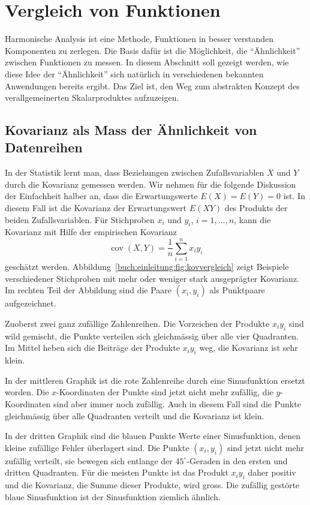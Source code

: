 %
%
%
\section{Vergleich von Funktionen
\label{buch:einleitung:section:vergleich}}
Harmonische Analysis ist eine Methode, Funktionen in besser
verstanden Komponenten zu zerlegen.
Die Basis dafür ist die Möglichkeit, die ``Ähnlichkeit'' zwischen
Funktionen zu messen.
In diesem Abschnitt soll gezeigt werden, wie diese Idee der
``Ähnlichkeit'' sich natürlich in verschiedenen bekannten
Anwendungen bereits ergibt.
Das Ziel ist, den Weg zum abstrakten Konzept des verallgemeinerten
Skalarproduktes aufzuzeigen.

%
%
\subsection{Kovarianz als Mass der Ähnlichkeit von Datenreihen}
In der Statistik lernt man, dass Beziehungen zwischen Zufallsvariablen
$X$ und $Y$ durch die Kovarianz gemessen werden.
Wir nehmen für die folgende Diskussion der Einfachheit halber an,
dass die Erwartungswerte $E(X)=E(Y)=0$ ist.
In diesem Fall ist die Kovarianz der Erwartungswert $E(XY)$ des
Produkts der beiden Zufallsvariablen.
Für Stichproben $x_i$ und $y_i$, $i=1,\dots,n$, kann die Kovarianz mit
Hilfe der empirischen Kovarianz
\[
\operatorname{cov}(X,Y)
=
\frac{1}{n}
\sum_{i=1}^n x_iy_i
\]
geschätzt werden.
Abbildung~\ref{buch:einleitung:fig:kovvergleich} zeigt Beispiele
verschiedener Stichproben mit mehr oder weniger stark ausgeprägter
Kovarianz.
Im rechten Teil der Abbildung sind die Paare $(x_i,y_i)$ als
Punktpaare aufgezeichnet.

Zuoberst zwei ganz zufällige Zahlenreihen.
Die Vorzeichen der Produkte $x_iy_i$ sind wild gemischt, die Punkte
verteilen sich gleichmässig über alle vier Quadranten.
Im Mittel heben sich die Beiträge der Produkte $x_iy_i$ weg, die
Kovarianz ist sehr klein.

In der mittleren Graphik ist die rote Zahlenreihe durch eine Sinusfunktion
ersetzt worden.
Die $x$-Koordinaten der Punkte sind jetzt nicht mehr zufällig, die
$y$-Koordinaten sind aber immer noch zufällig. 
Auch in diesem Fall sind die Punkte gleichmässig über alle Quadranten
verteilt und die Kovarianz ist klein.

In der dritten Graphik sind die blauen Punkte Werte einer
Sinusfunktion, denen kleine zufällige Fehler überlagert sind.
Die Punkte $(x_i,y_i)$ sind jetzt nicht mehr zufällig verteilt,
sie bewegen sich entlange der $45^\circ$-Geraden in den ersten
und dritten Quadranten.
Für die meisten Punkte ist das Produkt $x_iy_i$ daher positiv und
die Kovarianz, die Summe dieser Produkte, wird gross.
Die zufällig gestörte blaue Sinusfunktion ist der Sinusfunktion
ziemlich ähnlich.

